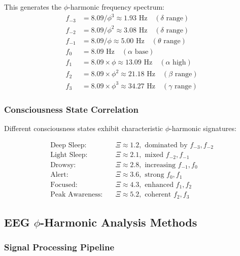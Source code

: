 This generates the $\phi$-harmonic frequency spectrum:
\begin{align}
 f_{-3} &= 8.09 / \phi^3 \approx 1.93 \text{ Hz} \quad (\delta \text{ range})\\
 f_{-2} &= 8.09 / \phi^2 \approx 3.08 \text{ Hz} \quad (\delta \text{ range})\\
 f_{-1} &= 8.09 / \phi \approx 5.00 \text{ Hz} \quad (\theta \text{ range})\\
 f_0 &= 8.09 \text{ Hz} \quad (\alpha \text{ base})\\
 f_1 &= 8.09 \times \phi \approx 13.09 \text{ Hz} \quad (\alpha \text{ high})\\
 f_2 &= 8.09 \times \phi^2 \approx 21.18 \text{ Hz} \quad (\beta \text{ range})\\
 f_3 &= 8.09 \times \phi^3 \approx 34.27 \text{ Hz} \quad (\gamma \text{ range})
\end{align}

\subsubsection{Consciousness State Correlation}

Different consciousness states exhibit characteristic $\phi$-harmonic signatures:

\begin{align}
 \text{Deep Sleep:} &\quad \Xi \approx 1.2, \text{ dominated by } f_{-3}, f_{-2}\\
 \text{Light Sleep:} &\quad \Xi \approx 2.1, \text{ mixed } f_{-2}, f_{-1}\\
 \text{Drowsy:} &\quad \Xi \approx 2.8, \text{ increasing } f_{-1}, f_0\\
 \text{Alert:} &\quad \Xi \approx 3.6, \text{ strong } f_0, f_1\\
 \text{Focused:} &\quad \Xi \approx 4.3, \text{ enhanced } f_1, f_2\\
 \text{Peak Awareness:} &\quad \Xi \approx 5.2, \text{ coherent } f_2, f_3
\end{align}

\subsection{EEG $\phi$-Harmonic Analysis Methods}

\subsubsection{Signal Processing Pipeline}

